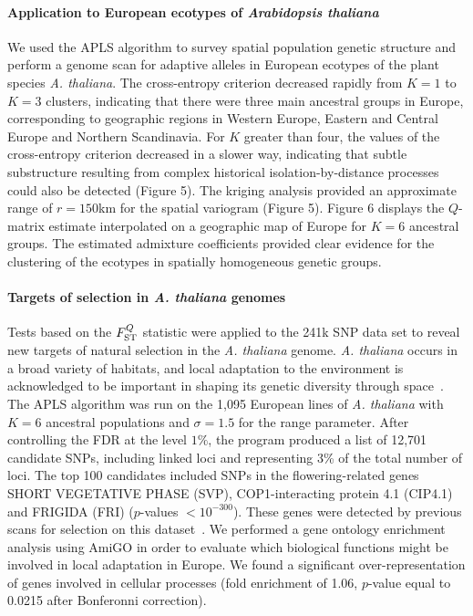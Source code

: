  
\paragraph{Application to European ecotypes of {\it Arabidopsis  thaliana}} We used  the APLS algorithm to survey spatial population genetic structure and perform a genome scan for adaptive alleles in European ecotypes of the plant species {\it A.  thaliana}. The cross-entropy criterion decreased rapidly from $K=1$ to $K=3$ clusters,  indicating  that  there were three main ancestral groups in Europe, corresponding to geographic regions in Western Europe, Eastern and Central Europe and Northern Scandinavia. For $K$ greater than four, the values of the cross-entropy criterion decreased in a slower way, indicating that subtle substructure resulting from complex historical isolation-by-distance  processes could also be detected (Figure 5). The kriging analysis provided an approximate range of  $r = 150$km for the spatial variogram (Figure 5). Figure 6 displays the $Q$-matrix estimate  interpolated on a geographic map of Europe for $K = 6$ ancestral groups. The estimated admixture coefficients provided clear evidence for the clustering of the ecotypes in spatially homogeneous genetic groups. 

\paragraph{Targets of selection in {\it A.  thaliana} genomes}  Tests based on the $F^Q_{\rm ST}$  statistic were applied to the 241k SNP data set to reveal new targets of natural selection in the {\it A. thaliana} genome. {\it A. thaliana} occurs in a broad variety of habitats, and local adaptation to the environment is acknowledged to be important in shaping its genetic diversity through space~\citep{Hancock2011, Fournier-Level2011}. 
The APLS algorithm was run on the 1,095 European lines of {\it A. thaliana} with $K=6$ ancestral populations and $\sigma = 1.5$ for the range parameter. After controlling the FDR at the level $1\%$, the program produced a list of 12,701 candidate SNPs, including linked loci and representing 3\% of the total number of loci. 
 The top 100 candidates included SNPs in the flowering-related genes SHORT VEGETATIVE PHASE (SVP), COP1-interacting protein 4.1 (CIP4.1) and FRIGIDA (FRI) ($p$-values $< 10^{-300}$). These genes were detected by previous scans for selection on this dataset~\citep{Horton2012}.
 We performed a gene ontology enrichment analysis using AmiGO in order to evaluate which biological functions might be involved in local adaptation in Europe. 
 We found a significant over-representation of genes involved in cellular processes (fold enrichment of 1.06, $p$-value equal to 0.0215 after Bonferonni correction).


